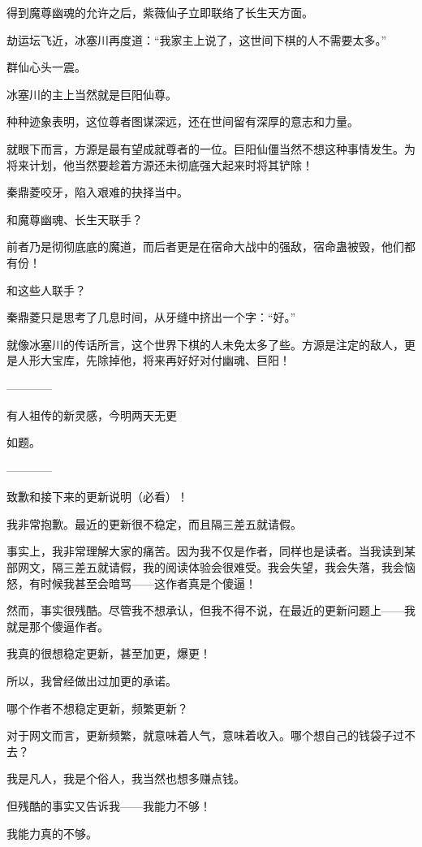 \begin{this_body}
得到魔尊幽魂的允许之后，紫薇仙子立即联络了长生天方面。

劫运坛飞近，冰塞川再度道：“我家主上说了，这世间下棋的人不需要太多。”

群仙心头一震。

冰塞川的主上当然就是巨阳仙尊。

种种迹象表明，这位尊者图谋深远，还在世间留有深厚的意志和力量。

就眼下而言，方源是最有望成就尊者的一位。巨阳仙僵当然不想这种事情发生。为将来计划，他当然要趁着方源还未彻底强大起来时将其铲除！

秦鼎菱咬牙，陷入艰难的抉择当中。

和魔尊幽魂、长生天联手？

前者乃是彻彻底底的魔道，而后者更是在宿命大战中的强敌，宿命蛊被毁，他们都有份！

和这些人联手？

秦鼎菱只是思考了几息时间，从牙缝中挤出一个字：“好。”

就像冰塞川的传话所言，这个世界下棋的人未免太多了些。方源是注定的敌人，更是人形大宝库，先除掉他，将来再好好对付幽魂、巨阳！

------------

有人祖传的新灵感，今明两天无更

如题。

------------

致歉和接下来的更新说明（必看）！

我非常抱歉。最近的更新很不稳定，而且隔三差五就请假。

事实上，我非常理解大家的痛苦。因为我不仅是作者，同样也是读者。当我读到某部网文，隔三差五就请假，我的阅读体验会很难受。我会失望，我会失落，我会恼怒，有时候我甚至会暗骂——这作者真是个傻逼！

然而，事实很残酷。尽管我不想承认，但我不得不说，在最近的更新问题上——我就是那个傻逼作者。

我真的很想稳定更新，甚至加更，爆更！

所以，我曾经做出过加更的承诺。

哪个作者不想稳定更新，频繁更新？

对于网文而言，更新频繁，就意味着人气，意味着收入。哪个想自己的钱袋子过不去？

我是凡人，我是个俗人，我当然也想多赚点钱。

但残酷的事实又告诉我——我能力不够！

我能力真的不够。


\end{this_body}
